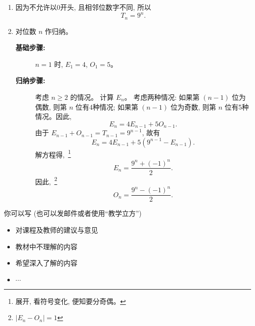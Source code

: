 \documentclass[a4paper, justified]{tufte-handout}
\begin{document}
\begin{solution}
  \begin{enumerate}[(1)]
    \item 因为不允许以0开头, 且相邻位数字不同, 所以
      \[
        T_{n} = 9^{n}.
      \]
    \item 对位数 $n$ 作归纳。
      \begin{description}
        \item[{\bf 基础步骤:}] $n = 1$ 时, $E_{1} = 4$, $O_{1} = 5$。
        \item[{\bf 归纳步骤:}] 考虑 $n \ge 2$ 的情况。
          计算 $E_{n}$。
          考虑两种情况: 如果第 $(n-1)$ 位为偶数, 则第 $n$ 位有4种情况;
          如果第 $(n-1)$ 位为奇数, 则第 $n$ 位有5种情况。因此,
          \[
            E_{n} = 4 E_{n-1} + 5 O_{n-1}.
          \]
          由于 $E_{n-1} + O_{n-1} = T_{n-1} = 9^{n-1}$, 故有
          \[
            E_{n} = 4E_{n-1} + 5 (9^{n-1} - E_{n-1}).
          \]
          解方程得,~\footnote{展开, 看符号变化, 便知要分奇偶。}
          \[
            E_{n} = \frac{9^{n} + (-1)^{n}}{2}.
          \]
          因此,~\footnote{$|E_{n} - O_{n}| = 1$}
          \[
            O_{n} = \frac{9^{n} - (-1)^{n}}{2}.
          \]
      \end{description}
  \end{enumerate}
\end{solution}


\begincorrection

\beginfb

你可以写 (也可以发邮件或者使用``教学立方'')
\begin{itemize}
  \item 对课程及教师的建议与意见
  \item 教材中不理解的内容
  \item 希望深入了解的内容
  \item $\cdots$
\end{itemize}
\end{document}
